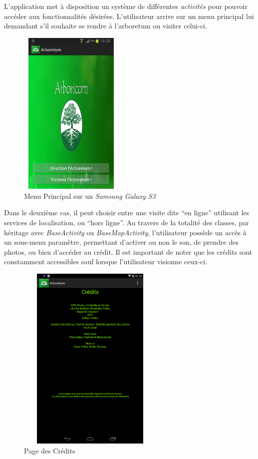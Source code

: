 \documentclass[a4paper,11pt]{article}
\begin{document}
		L'application met à disposition un système de différentes \emph{activités} pour pouvoir accéder aux fonctionnalités désirées. 
		L'utilisateur arrive sur un menu principal lui demandant s'il souhaite se rendre à l'arboretum ou visiter celui-ci. 
    \begin{figure}[H]
     \begin{center}
      \includegraphics[width=5cm,height=8cm]{menu.png}
      \caption{Menu Principal sur un \textit{Samsung Galaxy S3}}
     \end{center}
    \end{figure}
		Dans le deuxième cas, il peut choisir entre une visite dite ``en ligne'' utilisant les services de localisation, ou ``hors ligne''. 
		Au travers de la totalité des classes, par héritage avec \emph{BaseActivity} ou \emph{BaseMapActivity}, l'utilisateur possède un accès 
		à un sous-menu paramètre, permettant d'activer ou non le son, de prendre des photos, ou bien d’accéder au crédit. 
		Il est important de noter que les crédits sont constamment accessibles sauf lorsque l'utilisateur visionne ceux-ci. 
    \begin{figure}[H]
     \begin{center}
      \includegraphics[width=7cm,height=9cm]{credit.png}
      \caption{Page des Crédits}
     \end{center}
    \end{figure}
\end{document}
